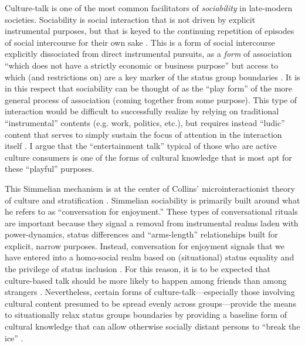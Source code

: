 \documentclass[11pt]{article}
\begin{document}
Culture-talk is one of the most common facilitators of \emph{sociability} in late-modern societies.  Sociability is social interaction that is not driven by explicit instrumental purposes, but that is keyed to the continuing repetition of episodes of social intercourse for their own sake \citep{simmel49}. This is a form of social intercourse explicitly dissociated from direct instrumental pursuits, as a \emph{form} of association ``which does not have a strictly economic or business purpose'' but access to which (and restrictions on) are a key marker of the status group boundaries \citep[114]{weber94}. It is in this respect that sociability can be thought of as the ``play form'' of the more general process of association (coming together from some purpose).  This type of interaction would be difficult to successfully realize by relying on traditional ``instrumental'' contents (e.g. work, politics, etc.), but requires instead ``ludic'' content that serves to simply sustain the focus of attention in the interaction itself \citep{collins04}.  I argue that the ``entertainment talk'' typical of those who are active culture consumers is one of the forms of cultural knowledge that is most apt for these ``playful'' purposes.

This Simmelian mechanism is at the center of Collins' microinteractionist theory of culture and stratification \citep{collins75, collins81, collins00, collins04}.  Simmelian sociability is primarily built around what he refers to as ``conversation for enjoyment.''  These types of conversational rituals are important because they signal a removal from instrumental realms laden with power-dynamics,  status differences and ``arms-length'' relationships built for explicit, narrow purposes.  Instead, conversation for enjoyment signals that we have entered  into a homo-social realm based on (situational) status equality and the privilege of status inclusion \citep{milner04}.  For this reason, it is to be expected  that culture-based talk should be more likely to happen among friends than among strangers \citep[124]{collins75}.  Nevertheless, certain forms of culture-talk---especially those involving cultural content presumed to be spread evenly across groups---provide the means to situationally relax status groups boundaries by providing a baseline form of cultural knowledge that can allow otherwise socially distant persons to ``break the ice'' \citep{erickson96}.  
\end{document}

